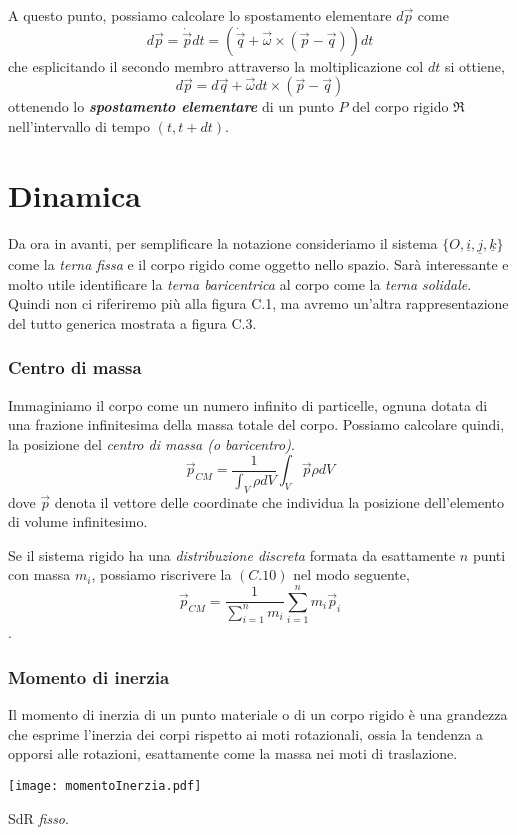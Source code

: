 A questo punto, possiamo calcolare lo spostamento elementare $d\vec{p}$ come 
\begin{equation}
	d \vec{p} = \dot{\vec{p}} dt = (\dot{\vec{q}} + \vec{\omega} \times (\vec{p} - \vec{q}))dt
\end{equation}
che esplicitando il secondo membro attraverso la moltiplicazione col $dt$ si ottiene,
\begin{equation}
	d\vec{p} = d\vec{q} + \vec{\omega}dt \times (\vec{p} - \vec{q})
\end{equation}
ottenendo lo \textbf{\emph{spostamento elementare}} di un punto $P$ del corpo rigido $\mathfrak{R}$ nell'intervallo di tempo $(t, t+dt)$.
\section{Dinamica}
Da ora in avanti, per semplificare la notazione consideriamo il sistema $\lbrace O, \underline{i}, \underline{j}, \underline{k} \rbrace$ come la \emph{terna fissa} e il corpo rigido come oggetto nello spazio. Sarà interessante e molto utile identificare la \emph{terna baricentrica} al corpo come la \emph{terna solidale}. Quindi non ci riferiremo più alla figura C.1, ma avremo un'altra rappresentazione del tutto generica mostrata a figura C.3.   
\subsubsection{Centro di massa}
Immaginiamo il corpo come un numero infinito di particelle, ognuna dotata di una frazione infinitesima della massa totale del corpo. Possiamo calcolare quindi, la posizione del \emph{centro di massa (o baricentro)}.
\begin{equation}
	\vec{p}_{CM} = \frac{1}{\int_{V} \rho dV} \int_{V} \vec{p} \rho dV 
\end{equation} 
dove $\vec{p}$ denota il vettore delle coordinate che individua la posizione dell'elemento di volume infinitesimo. 

Se il sistema rigido ha una \emph{distribuzione discreta} formata da esattamente $n$ punti con massa $m_i$, possiamo riscrivere la $(C.10)$ nel modo seguente,
\begin{equation}
	\vec{p}_{CM} = \frac{1}{\sum_{i = 1}^{n} m_i} \sum_{i = 1}^{n} m_i \vec{p}_i
\end{equation}.
\subsubsection{Momento di inerzia}
Il momento di inerzia di un punto materiale o di un corpo rigido è una grandezza che esprime l'inerzia dei corpi rispetto ai moti rotazionali, ossia la tendenza a opporsi alle rotazioni, esattamente come la massa nei moti di traslazione.
\begin{center}
	\texttt{[image: momentoInerzia.pdf]}
	\caption{SdR \emph{fisso}.}
\end{center}
